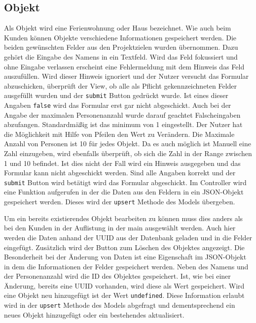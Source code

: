 \subsection{Objekt}
Als Objekt wird eine Ferienwohnung oder Haus bezeichnet. Wie auch beim Kunden können Objekte verschiedene Informationen gespeichert werden. Die beiden gewünschten Felder aus den Projektzielen wurden übernommen. Dazu gehört die Eingabe des Namens in ein Textfeld. Wird das Feld fokussiert und ohne Eingabe verlassen erscheint eine Fehlermeldung mit dem Hinweis das Feld auszufüllen. Wird dieser Hinweis ignoriert und der Nutzer versucht das Formular abzuschicken, überprüft der View, ob alle als Pflicht gekennzeichneten Felder ausgefüllt wurden und der \texttt{submit} Button gedrückt wurde. Ist eines dieser Angaben \texttt{false} wird das Formular erst gar nicht abgeschickt. Auch bei der Angabe der maximalen Personenanzahl wurde darauf geachtet Falscheingaben abzufangen. Standardmäßig ist das minimum von 1 eingestellt. Der Nutzer hat die Möglichkeit mit Hilfe von Pfeilen den Wert zu Verändern. Die Maximale Anzahl von Personen ist 10 für jedes Objekt. Da es auch möglich ist Manuell eine Zahl einzugeben, wird ebenfalls überprüft, ob sich die Zahl in der Range zwischen 1 und 10 befindet. Ist dies nicht der Fall wird ein Hinweis ausgegeben und das Formular kann nicht abgeschickt werden. Sind alle Angaben korrekt und der \texttt{submit} Button wird betätigt wird das Formular abgeschickt. Im Controller wird eine Funktion aufgerufen in der die Daten aus den Feldern in ein JSON-Objekt gespeichert werden. Dieses wird der \texttt{upsert} Methode des Models übergeben. 

Um ein bereits existierendes Objekt bearbeiten zu können muss dies anders als bei den Kunden in der Auflistung in der main ausgewählt werden. Auch hier werden die Daten anhand der UUID aus der Datenbank geladen und in die Felder eingefügt. Zusätzlich wird der Button zum Löschen des Objektes angezeigt. Die Besonderheit bei der Änderung von Daten ist eine Eigenschaft im JSON-Objekt in dem die Informationen der Felder gespeichert werden. Neben des Namens und der Personenanzahl wird die ID des Objektes gespeichert. Ist, wie bei einer Änderung, bereits eine UUID vorhanden, wird diese als Wert gespeichert. Wird eine Objekt neu hinzugefügt ist der Wert \texttt{undefined}. Diese Information erlaubt wird in der \texttt{upsert} Methode des Models abgefragt und dementsprechend ein neues Objekt hinzugefügt oder ein bestehendes aktualisiert.

